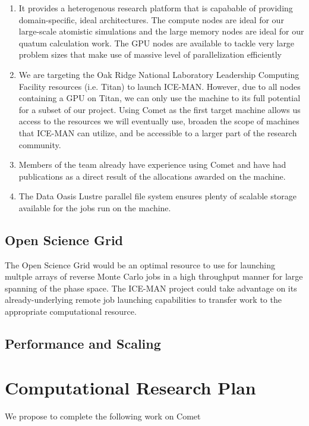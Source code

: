 \documentclass{proposalnsf}
\begin{document}
\begin{enumerate}
\item It provides a heterogenous research platform that is capabable of providing domain-specific, ideal architectures. The compute nodes are ideal for our large-scale atomistic simulations and the large memory nodes are ideal for our quatum calculation work. The GPU nodes are available to tackle very large problem sizes that make use of massive level of parallelization efficiently

\item We are targeting the Oak Ridge National Laboratory Leadership Computing Facility resources (i.e. Titan) to launch ICE-MAN. However, due to all nodes containing a GPU on Titan, we can only use the machine to its full potential for a subset of our project. Using Comet as the first target machine allows us access to the resources we will eventually use, broaden the scope of machines that ICE-MAN can utilize, and be accessible to a larger part of the research community.

\item Members of the team already have experience using Comet and have had publications as a direct result of the allocations awarded on the machine.

\item The Data Oasis Lustre parallel file system ensures plenty of scalable storage available for the jobs run on the machine.

\end{enumerate}

\subsection*{Open Science Grid}
The Open Science Grid would be an optimal resource to use for launching multple arrays of reverse Monte Carlo jobs in a high throughput manner for large spanning of the phase space. The ICE-MAN project could take advantage on its already-underlying remote job launching capabilities to transfer work to the appropriate computational resource.

\subsection*{Performance and Scaling}


\section*{Computational Research Plan}
We propose to complete the following work on Comet 
\end{document}
